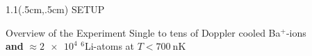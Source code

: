 \begin{frame}[plain, t]
    \begin{textblock*}{1.1\linewidth}(.5cm,.5cm)
        {\huge \color{white} \textsc{SETUP}}
    \end{textblock*}
\end{frame}

\begin{frame}[t]{Overview of the Experiment}
    Single to tens of Doppler cooled Ba$^+$-ions \\
    \textbf{and} $\approx \num{2e4}$ $^6$Li-atoms at $T<\SI{700}{\nano\kelvin}$
\end{frame}

